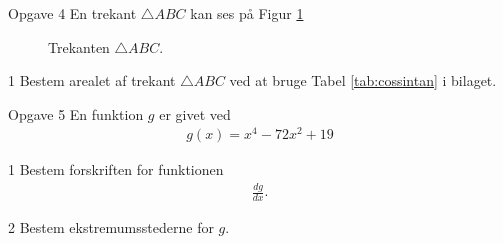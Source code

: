 \documentclass[12pt,x11names,a4paper]{article}
\begin{document}
%
%
%
%
%
\begin{opgavetekst}{Opgave 4}
En trekant $\triangle ABC$ kan ses på Figur \ref{fig:trekantareal}

\begin{figure}[H]
	\centering
	\caption{Trekanten $\triangle ABC$.}
	\label{fig:trekantareal}
\end{figure}
\phantom{h}
\end{opgavetekst}
\begin{delopgave}{1}
	Bestem arealet af trekant $\triangle ABC$ ved at bruge Tabel \ref{tab:cossintan} i bilaget.
\end{delopgave}
%
%
%
%
%
\newpage
\begin{opgavetekst}{Opgave 5}
	En funktion $g$ er givet ved
	\begin{align*}
		g(x) = x^4-72x^2 + 19
	\end{align*}
\end{opgavetekst}
\begin{delopgave}{1}
	Bestem forskriften for funktionen 
	\begin{align*}
		\frac{dg}{dx}.
	\end{align*}
\end{delopgave}
\begin{delopgave}{2}
	Bestem ekstremumsstederne for $g$. 
\end{delopgave}
%
%
%
%
%
\end{document}
